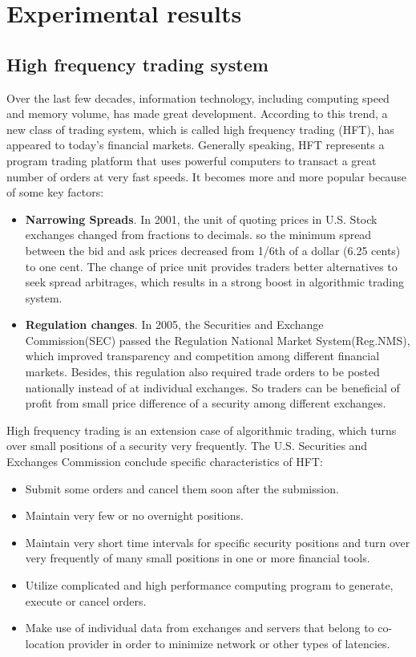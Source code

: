 \chapter{Experimental results}
\section{High frequency trading system}
Over the last few decades, information technology, including computing speed and memory volume, has made great development. According to this trend, a new class of trading system, which is called high frequency trading (HFT), has appeared to today's financial markets. Generally speaking,  HFT represents a program trading platform that uses powerful computers to transact a great number of orders at very fast speeds. It becomes more and more popular because of some key factors:\\
\begin{itemize}
\item \textbf{Narrowing Spreads}. In 2001, the unit of quoting prices in U.S. Stock exchanges changed from fractions to decimals. so the minimum spread between the bid and ask prices decreased from 1/6th of a dollar (6.25 cents) to one cent. The change of  price unit provides traders better alternatives to seek spread arbitrages, which results in a strong boost in algorithmic trading system.  \\
\item \textbf{Regulation changes}. In 2005, the Securities and Exchange Commission(SEC) passed the Regulation National Market System(Reg.NMS), which improved transparency and competition among different financial markets. Besides, this regulation also required trade orders to be posted nationally instead of at individual exchanges. So traders can be beneficial of profit from small price difference of a security among different exchanges. \\
\end{itemize}

High frequency trading is an extension case of algorithmic trading, which turns over small positions of a security very frequently. The U.S. Securities and Exchanges Commission conclude specific characteristics of HFT:\\

\begin{itemize}
\item Submit some orders and cancel them soon after the submission.
\item Maintain very few or no overnight positions. 
\item Maintain very short time intervals for specific security positions and turn over very frequently of many small positions in one or more financial tools.
\item Utilize complicated and high performance computing program to generate, execute or cancel orders.
\item Make use of individual data from exchanges and servers that belong to co-location provider in order to minimize network or other types of latencies. 
\end{itemize}

